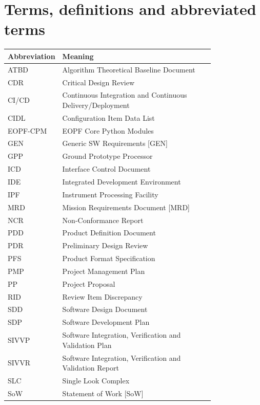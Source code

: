 \section{Terms, definitions and abbreviated terms}

\begin{xltabular}{\textwidth}{|l|>{\raggedright\arraybackslash}p{0.8\linewidth}|}\hline
    Abbreviation & Meaning \\\hline \hline
    ATBD & Algorithm Theoretical Baseline Document \\ \hline
    CDR & Critical Design Review \\ \hline
    CI/CD & Continuous Integration and Continuous Delivery/Deployment \\ \hline
    CIDL & Configuration Item Data List \\ \hline
    EOPF-CPM & EOPF Core Python Modules \\ \hline
    GEN & Generic SW Requirements [GEN] \\ \hline
    GPP & Ground Prototype Processor \\ \hline
    ICD & Interface Control Document \\ \hline
    IDE & Integrated Development Environment \\ \hline
    IPF & Instrument Processing Facility \\ \hline
    MRD & Mission Requirements Document [MRD] \\ \hline
    NCR & Non-Conformance Report \\ \hline
    PDD & Product Definition Document \\ \hline
    PDR & Preliminary Design Review \\ \hline
    PFS & Product Format Specification \\ \hline
    PMP & Project Management Plan \\ \hline
    PP & Project Proposal \\ \hline
    RID & Review Item Discrepancy \\ \hline
    SDD & Software Design Document \\ \hline
    SDP & Software Development Plan \\ \hline
    SIVVP & Software Integration, Verification and Validation Plan \\ \hline
    SIVVR & Software Integration, Verification and Validation Report \\ \hline
    SLC & Single Look Complex \\ \hline
    SoW & Statement of Work [SoW] \\ \hline

\end{xltabular}

